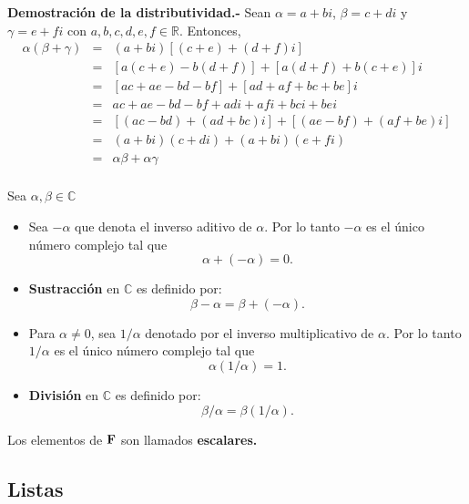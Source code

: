 \textbf{Demostración de la distributividad.-}\; Sean $\alpha=a+bi$, $\beta=c+di$ y $\gamma=e+fi$ con $a,b,c,d,e,f\in \mathbb{R}$. Entonces,
$$\begin{array}{rcl}
    \alpha(\beta+\gamma) & = & (a+bi)\left[(c+e)+(d+f)i\right]\\
			 & = & \left[a(c+e)-b(d+f)\right]+\left[a(d+f)+b(c+e)\right]i\\
			 & = & \left[ac+ae-bd-bf\right]+\left[ad+af+bc+be\right]i\\
			 & = & ac+ae-bd-bf+adi+afi+bci+bei\\
			 & = & \left[(ac-bd)+(ad+bc)i\right] + \left[(ae-bf)+(af+be)i\right]\\
			 & = & (a+bi)(c+di)+(a+bi)(e+fi)\\
			 & = & \alpha\beta + \alpha\gamma\\
\end{array}$$
\vspace{0.5cm}


\begin{tcolorbox}
    \begin{def.} 
	Sea $\alpha, \beta \in \mathbb{C}$
	\begin{itemize}
	    \item Sea $-\alpha$ que denota el inverso aditivo de $\alpha$. Por lo tanto $-\alpha$ es el único número complejo tal que 
		$$\alpha + (-\alpha) = 0.$$

	    \item \textbf{Sustracción} en $\mathbb{C}$ es definido por:
		$$\beta - \alpha = \beta + (-\alpha).$$

	    \item Para $\alpha\neq 0$, sea $1/\alpha$ denotado por el inverso multiplicativo de $\alpha$. Por lo tanto $1/\alpha$ es el único número complejo tal que
		$$\alpha (1/\alpha)=1.$$

	    \item \textbf{División} en $\mathbb{C}$ es definido por:
		$$\beta/\alpha = \beta(1/\alpha).$$
	\end{itemize}
    \end{def.}
\end{tcolorbox}

Los elementos de $\bf{F}$ son llamados \textbf{escalares.}\\

\subsection{Listas}

